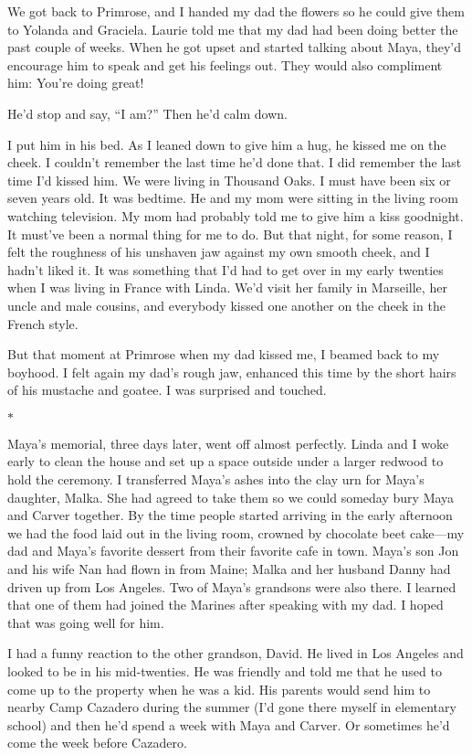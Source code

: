 \documentclass[12pt]{book}
\begin{document}
We got back to Primrose, and I handed my dad the flowers so he could give them to Yolanda and Graciela. Laurie told me that my dad had been doing better the past couple of weeks. When he got upset and started talking about Maya, they'd encourage him to speak and get his feelings out. They would also compliment him: You're doing great!

He'd stop and say, ``I am?'' Then he'd calm down.

I put him in his bed. As I leaned down to give him a hug, he kissed me on the cheek. I couldn't remember the last time he'd done that. I did remember the last time I'd kissed him. We were living in Thousand Oaks. I must have been six or seven years old. It was bedtime. He and my mom were sitting in the living room watching television. My mom had probably told me to give him a kiss goodnight. It must've been a normal thing for me to do. But that night, for some reason, I felt the roughness of his unshaven jaw against my own smooth cheek, and I hadn't liked it. It was something that I'd had to get over in my early twenties when I was living in France with Linda. We'd visit her family in Marseille, her uncle and male cousins, and everybody kissed one another on the cheek in the French style.

But that moment at Primrose when my dad kissed me, I beamed back to my boyhood. I felt again my dad's rough jaw, enhanced this time by the short hairs of his mustache and goatee. I was surprised and touched.

\begin{center}$*$\end{center}

Maya's memorial, three days later, went off almost perfectly. Linda and I woke early to clean the house and set up a space outside under a larger redwood to hold the ceremony. I transferred Maya's ashes into the clay urn for Maya's daughter, Malka. She had agreed to take them so we could someday bury Maya and Carver together. By the time people started arriving in the early afternoon we had the food laid out in the living room, crowned by chocolate beet cake---my dad and Maya's favorite dessert from their favorite cafe in town. Maya's son Jon and his wife Nan had flown in from Maine; Malka and her husband Danny had driven up from Los Angeles. Two of Maya's grandsons were also there. I learned that one of them had joined the Marines after speaking with my dad. I hoped that was going well for him.

I had a funny reaction to the other grandson, David. He lived in Los Angeles and looked to be in his mid-twenties. He was friendly and told me that he used to come up to the property when he was a kid. His parents would send him to nearby Camp Cazadero during the summer (I'd gone there myself in elementary school) and then he'd spend a week with Maya and Carver. Or sometimes he'd come the week before Cazadero.
\end{document}
